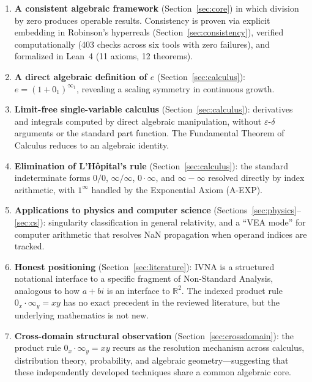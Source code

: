 \documentclass[12pt]{article}
\theoremstyle{definition}
\theoremstyle{remark}
\newcommand{\vz}[1]{0_{#1}}             %
\newcommand{\vi}[1]{\infty_{#1}}        %
\newcommand{\R}{\mathbb{R}}
\begin{document}
\begin{enumerate}[leftmargin=2em]
\item \textbf{A consistent algebraic framework} (Section~\ref{sec:core})
  in which division by zero produces operable results. Consistency is
  proven via explicit embedding in Robinson's hyperreals
  (Section~\ref{sec:consistency}), verified computationally
  (403 checks across six tools with zero failures),
  and formalized in Lean~4 (11 axioms, 12 theorems).

\item \textbf{A direct algebraic definition of $e$}
  (Section~\ref{sec:calculus}): $e = (1 + \vz{1})^{\vi{1}}$, revealing
  a scaling symmetry in continuous growth.

\item \textbf{Limit-free single-variable calculus}
  (Section~\ref{sec:calculus}): derivatives and integrals computed
  by direct algebraic manipulation, without $\varepsilon$-$\delta$
  arguments or the standard part function. The Fundamental Theorem
  of Calculus reduces to an algebraic identity.

\item \textbf{Elimination of L'H\^opital's rule}
  (Section~\ref{sec:calculus}): the standard indeterminate forms
  $0/0$, $\infty/\infty$, $0 \cdot \infty$, and $\infty - \infty$
  resolved directly by index arithmetic, with $1^\infty$ handled
  by the Exponential Axiom (A-EXP).

\item \textbf{Applications to physics and computer science}
  (Sections~\ref{sec:physics}--\ref{sec:cs}): singularity
  classification in general relativity, and a ``VEA mode'' for
  computer arithmetic that resolves NaN propagation when operand
  indices are tracked.

\item \textbf{Honest positioning} (Section~\ref{sec:literature}):
  IVNA is a structured notational interface to a specific fragment of
  Non-Standard Analysis, analogous to how $a + bi$ is an interface to
  $\R^2$. The indexed product rule $\vz{x} \cdot \vi{y} = xy$ has no
  exact precedent in the reviewed literature, but the underlying
  mathematics is not new.

\item \textbf{Cross-domain structural observation}
  (Section~\ref{sec:crossdomain}): the product rule
  $\vz{x} \cdot \vi{y} = xy$ recurs as the resolution mechanism
  across calculus, distribution theory, probability, and algebraic
  geometry---suggesting that these independently developed
  techniques share a common algebraic core.
\end{enumerate}
\end{document}
